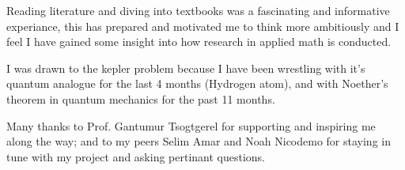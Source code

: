 \documentclass[12pt]{article}
\begin{document}
Reading literature and diving into textbooks was a fascinating and informative experiance, this has prepared and motivated me to think more ambitiously and I feel I have gained some insight into how research in applied math is conducted.

I was drawn to the kepler problem because I have been wrestling with it's quantum analogue for the last 4 months (Hydrogen atom), and with Noether's theorem in quantum mechanics for the past 11 months. 

Many thanks to Prof. Gantumur Tsogtgerel for supporting and inspiring me along the way; and to my peers Selim Amar and Noah Nicodemo for staying in tune with my project and asking pertinant questions. 



\end{document}
